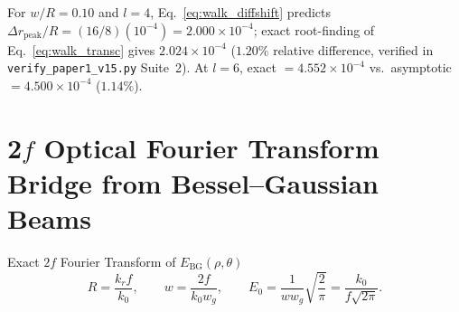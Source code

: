 \documentclass[10pt,letterpaper]{article}
\numberwithin{equation}{section}
\begin{document}
\begin{pencheck}
For $w/R = 0.10$ and $l = 4$, Eq.~\eqref{eq:walk_diffshift} predicts $\Delta r_{\mathrm{peak}}/R = (16/8)(10^{-4}) = 2.000\times 10^{-4}$; exact root-finding of Eq.~\eqref{eq:walk_transc} gives $2.024\times 10^{-4}$ ($1.20\%$ relative difference, verified in \texttt{verify\_paper1\_v15.py} Suite~2). At $l=6$, exact $= 4.552\times 10^{-4}$ vs.\ asymptotic $= 4.500\times 10^{-4}$ ($1.14\%$).
\end{pencheck}

\section{2$f$ Optical Fourier Transform Bridge from Bessel--Gaussian Beams}
\label{sec:p1_2f}

\begin{targeteq}{Exact $2f$ Fourier Transform of $E_{\mathrm{BG}}(\rho,\theta)$}
\[
  R = \frac{k_r f}{k_0}, \qquad w = \frac{2f}{k_0 w_g}, \qquad E_0 = \frac{1}{w w_g}\sqrt{\frac{2}{\pi}} = \frac{k_0}{f\sqrt{2\pi}}.
\]
\end{targeteq}
\end{document}
